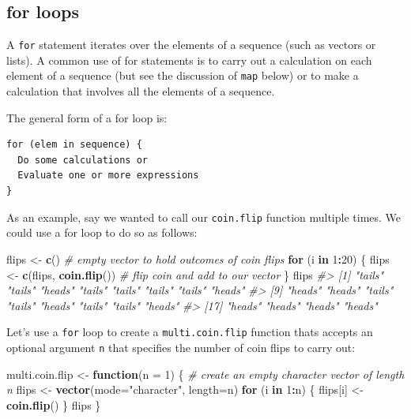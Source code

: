 \documentclass[]{book}
\newenvironment{Shaded}{\begin{snugshade}}{\end{snugshade}}
\newcommand{\CommentTok}[1]{\textcolor[rgb]{0.56,0.35,0.01}{\textit{#1}}}
\newcommand{\ControlFlowTok}[1]{\textcolor[rgb]{0.13,0.29,0.53}{\textbf{#1}}}
\newcommand{\DataTypeTok}[1]{\textcolor[rgb]{0.13,0.29,0.53}{#1}}
\newcommand{\DecValTok}[1]{\textcolor[rgb]{0.00,0.00,0.81}{#1}}
\newcommand{\KeywordTok}[1]{\textcolor[rgb]{0.13,0.29,0.53}{\textbf{#1}}}
\newcommand{\NormalTok}[1]{#1}
\newcommand{\OperatorTok}[1]{\textcolor[rgb]{0.81,0.36,0.00}{\textbf{#1}}}
\newcommand{\StringTok}[1]{\textcolor[rgb]{0.31,0.60,0.02}{#1}}
\theoremstyle{definition}
\theoremstyle{definition}
\theoremstyle{definition}
\theoremstyle{remark}
\begin{document}
\hypertarget{for-loops}{%
\subsection{for loops}\label{for-loops}}

A \texttt{for} statement iterates over the elements of a sequence (such
as vectors or lists). A common use of for statements is to carry out a
calculation on each element of a sequence (but see the discussion of
\texttt{map} below) or to make a calculation that involves all the
elements of a sequence.

The general form of a for loop is:

\begin{verbatim}
for (elem in sequence) {
  Do some calculations or
  Evaluate one or more expressions
}
\end{verbatim}

As an example, say we wanted to call our \texttt{coin.flip} function
multiple times. We could use a for loop to do so as follows:

\begin{Shaded}
\begin{Highlighting}[]
\NormalTok{flips <-}\StringTok{ }\KeywordTok{c}\NormalTok{() }\CommentTok{# empty vector to hold outcomes of coin flips}
\ControlFlowTok{for}\NormalTok{ (i }\ControlFlowTok{in} \DecValTok{1}\OperatorTok{:}\DecValTok{20}\NormalTok{) \{}
\NormalTok{  flips <-}\StringTok{ }\KeywordTok{c}\NormalTok{(flips, }\KeywordTok{coin.flip}\NormalTok{())  }\CommentTok{# flip coin and add to our vector}
\NormalTok{\}}
\NormalTok{flips}
\CommentTok{#>  [1] "tails" "tails" "heads" "tails" "tails" "tails" "tails" "heads"}
\CommentTok{#>  [9] "heads" "heads" "tails" "tails" "heads" "tails" "tails" "heads"}
\CommentTok{#> [17] "heads" "heads" "heads" "heads"}
\end{Highlighting}
\end{Shaded}

Let's use a \texttt{for} loop to create a \texttt{multi.coin.flip}
function thats accepts an optional argument \texttt{n} that specifies
the number of coin flips to carry out:

\begin{Shaded}
\begin{Highlighting}[]
\NormalTok{multi.coin.flip <-}\StringTok{ }\ControlFlowTok{function}\NormalTok{(}\DataTypeTok{n =} \DecValTok{1}\NormalTok{) \{}
  \CommentTok{# create an empty character vector of length n}
\NormalTok{  flips <-}\StringTok{ }\KeywordTok{vector}\NormalTok{(}\DataTypeTok{mode=}\StringTok{"character"}\NormalTok{, }\DataTypeTok{length=}\NormalTok{n)  }
  \ControlFlowTok{for}\NormalTok{ (i }\ControlFlowTok{in} \DecValTok{1}\OperatorTok{:}\NormalTok{n) \{}
\NormalTok{    flips[i] <-}\StringTok{ }\KeywordTok{coin.flip}\NormalTok{()}
\NormalTok{  \}}
\NormalTok{  flips}
\NormalTok{\}}
\end{Highlighting}
\end{Shaded}
\end{document}
